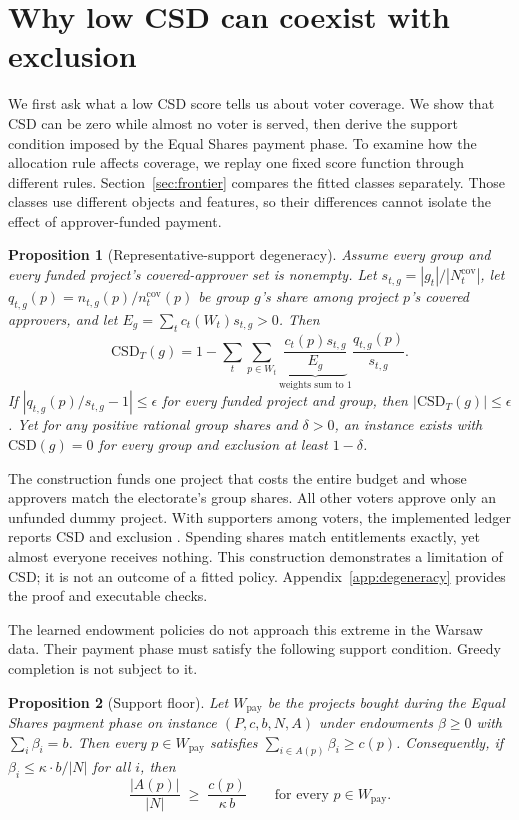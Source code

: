 \documentclass{article}
\newtheorem{proposition}{Proposition}
\newcommand{\csd}{\mathrm{CSD}}
\begin{document}
\section{Why low CSD can coexist with exclusion}
\label{sec:theory}

We first ask what a low CSD score tells us about voter coverage. We show that
CSD can be zero while almost no voter is served, then derive the support
condition imposed by the Equal Shares payment phase. To examine how the
allocation rule affects coverage, we replay one fixed score function through
different rules. Section~\ref{sec:frontier} compares the fitted classes
separately. Those classes use different objects and features, so their
differences cannot isolate the effect of approver-funded payment.

\begin{proposition}[Representative-support degeneracy]
\label{prop:representative}
Assume every group and every funded project's covered-approver set is nonempty.
Let $s_{t,g}=|g_t|/|N_t^{\mathrm{cov}}|$, let
$q_{t,g}(p)=n_{t,g}(p)/n_t^{\mathrm{cov}}(p)$ be group $g$'s share among
project $p$'s covered approvers, and let
$E_g=\sum_t c_t(W_t)s_{t,g}>0$. Then
\[
\csd_T(g)=1-\sum_t\sum_{p\in W_t}
\underbrace{\frac{c_t(p)s_{t,g}}{E_g}}_{\text{weights sum to }1}
\frac{q_{t,g}(p)}{s_{t,g}}.
\]
If $|q_{t,g}(p)/s_{t,g}-1|\le\epsilon$ for every funded project and group, then
$|\csd_T(g)|\le\epsilon$. Yet for any positive rational group shares and
$\delta>0$, an
instance exists with $\csd(g)=0$ for every group and exclusion at least
$1-\delta$.
\end{proposition}

The construction funds one project that costs the entire budget and whose
approvers match the electorate's group shares. All other voters approve only
an unfunded dummy project. With \DegSupporters{} supporters among
\DegVoters{} voters, the implemented ledger reports CSD \DegCSD{} and
exclusion \DegExcl{}. Spending shares match entitlements exactly, yet almost
everyone receives nothing. This construction demonstrates a limitation of CSD;
it is not an outcome of a fitted policy. Appendix~\ref{app:degeneracy} provides
the proof and executable checks.

The learned endowment policies do not approach this extreme in the Warsaw
data. Their payment phase must satisfy the following support condition.
Greedy completion is not subject to it.

\begin{proposition}[Support floor]
\label{prop:support}
Let $W_{\mathrm{pay}}$ be the projects bought during the Equal Shares payment
phase on instance $(P, c, b, N, A)$ under endowments $\beta \ge 0$ with
$\sum_i \beta_i = b$. Then every $p \in W_{\mathrm{pay}}$
satisfies $\sum_{i \in A(p)} \beta_i \ge c(p)$. Consequently, if
$\beta_i \le \kappa \cdot b / |N|$ for all $i$, then
\[
\frac{|A(p)|}{|N|} \;\ge\; \frac{c(p)}{\kappa\, b}
\qquad\text{for every }p\in W_{\mathrm{pay}} .
\]
\end{proposition}
\end{document}
